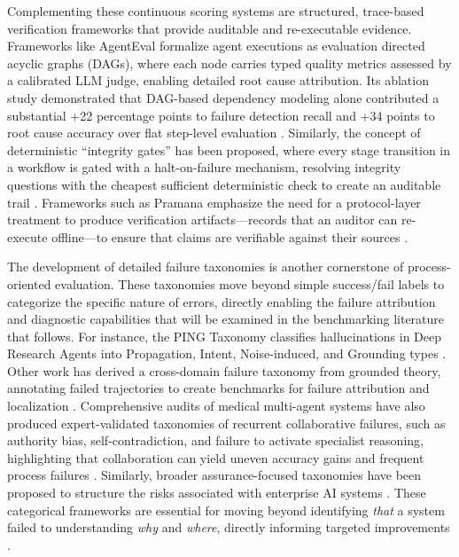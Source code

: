 \documentclass[11pt]{article}
\begin{document}
Complementing these continuous scoring systems are structured, trace-based verification frameworks that provide auditable and re-executable evidence. Frameworks like AgentEval formalize agent executions as evaluation directed acyclic graphs (DAGs), where each node carries typed quality metrics assessed by a calibrated LLM judge, enabling detailed root cause attribution. Its ablation study demonstrated that DAG-based dependency modeling alone contributed a substantial +22 percentage points to failure detection recall and +34 points to root cause accuracy over flat step-level evaluation \cite{ref331}. Similarly, the concept of deterministic ``integrity gates'' has been proposed, where every stage transition in a workflow is gated with a halt-on-failure mechanism, resolving integrity questions with the cheapest sufficient deterministic check to create an auditable trail \cite{ref332}. Frameworks such as Pramana emphasize the need for a protocol-layer treatment to produce verification artifacts---records that an auditor can re-execute offline---to ensure that claims are verifiable against their sources \cite{ref333}.

The development of detailed failure taxonomies is another cornerstone of process-oriented evaluation. These taxonomies move beyond simple success/fail labels to categorize the specific nature of errors, directly enabling the failure attribution and diagnostic capabilities that will be examined in the benchmarking literature that follows. For instance, the PING Taxonomy classifies hallucinations in Deep Research Agents into Propagation, Intent, Noise-induced, and Grounding types \cite{ref327}. Other work has derived a cross-domain failure taxonomy from grounded theory, annotating failed trajectories to create benchmarks for failure attribution and localization \cite{ref334}. Comprehensive audits of medical multi-agent systems have also produced expert-validated taxonomies of recurrent collaborative failures, such as authority bias, self-contradiction, and failure to activate specialist reasoning, highlighting that collaboration can yield uneven accuracy gains and frequent process failures \cite{ref335}. Similarly, broader assurance-focused taxonomies have been proposed to structure the risks associated with enterprise AI systems \cite{ref336}. These categorical frameworks are essential for moving beyond identifying \emph{that} a system failed to understanding \emph{why} and \emph{where}, directly informing targeted improvements \cite{ref337}.
\end{document}
